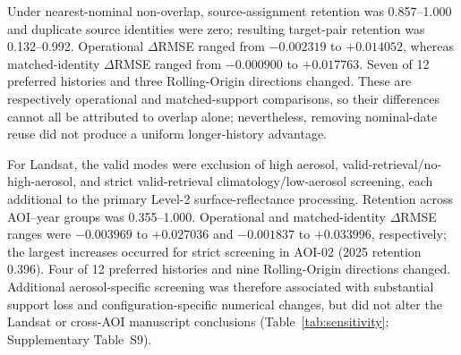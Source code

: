 Under nearest-nominal non-overlap, source-assignment retention was 0.857--1.000 and duplicate source identities were zero; resulting target-pair retention was 0.132--0.992. Operational $\Delta$RMSE ranged from $-0.002319$ to $+0.014052$, whereas matched-identity $\Delta$RMSE ranged from $-0.000900$ to $+0.017763$. Seven of 12 preferred histories and three Rolling-Origin directions changed. These are respectively operational and matched-support comparisons, so their differences cannot all be attributed to overlap alone; nevertheless, removing nominal-date reuse did not produce a uniform longer-history advantage.

For Landsat, the valid modes were exclusion of high aerosol, valid-retrieval/no-high-aerosol, and strict valid-retrieval climatology/low-aerosol screening, each additional to the primary Level-2 surface-reflectance processing. Retention across AOI--year groups was 0.355--1.000. Operational and matched-identity $\Delta$RMSE ranges were $-0.003969$ to $+0.027036$ and $-0.001837$ to $+0.033996$, respectively; the largest increases occurred for strict screening in AOI-02 (2025 retention 0.396). Four of 12 preferred histories and nine Rolling-Origin directions changed. Additional aerosol-specific screening was therefore associated with substantial support loss and configuration-specific numerical changes, but did not alter the Landsat or cross-AOI manuscript conclusions (Table~\ref{tab:sensitivity}; Supplementary Table~S9).


